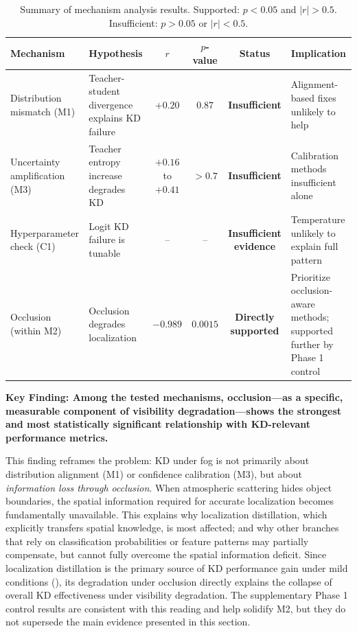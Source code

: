 \begin{table}[htbp]
\centering
\caption{Summary of mechanism analysis results. Supported: $p < 0.05$ and $|r| > 0.5$. Insufficient: $p > 0.05$ or $|r| < 0.5$.}
\label{tab:mechanism_summary}
\begin{tabular}{@{}p{3cm}p{4.5cm}cccp{3cm}@{}}
\toprule
Mechanism & Hypothesis & $r$ & $p$-value & Status & Implication \\
\midrule
Distribution mismatch (M1) & Teacher-student divergence explains KD failure & $+0.20$ & $0.87$ & \textbf{Insufficient} & Alignment-based fixes unlikely to help \\
Uncertainty amplification (M3) & Teacher entropy increase degrades KD & $+0.16$ to $+0.41$ & $>0.7$ & \textbf{Insufficient} & Calibration methods insufficient alone \\
Hyperparameter check (C1) & Logit KD failure is tunable & -- & -- & \textbf{Insufficient evidence} & Temperature unlikely to explain full pattern \\
Occlusion (within M2) & Occlusion degrades localization & $\mathbf{-0.989}$ & $\mathbf{0.0015}$ & \textbf{Directly supported} & Prioritize occlusion-aware methods; supported further by Phase 1 control \\
\bottomrule
\end{tabular}
\end{table}

\textbf{Key Finding: Among the tested mechanisms, occlusion---as a specific, measurable component of visibility degradation---shows the strongest and most statistically significant relationship with KD-relevant performance metrics.}

This finding reframes the problem: KD under fog is not primarily about distribution alignment (M1) or confidence calibration (M3), but about \emph{information loss through occlusion}. When atmospheric scattering hides object boundaries, the spatial information required for accurate localization becomes fundamentally unavailable. This explains why localization distillation, which explicitly transfers spatial knowledge, is most affected; and why other branches that rely on classification probabilities or feature patterns may partially compensate, but cannot fully overcome the spatial information deficit. Since localization distillation is the primary source of KD performance gain under mild conditions (), its degradation under occlusion directly explains the collapse of overall KD effectiveness under visibility degradation. The supplementary Phase 1 control results are consistent with this reading and help solidify M2, but they do not supersede the main evidence presented in this section.


